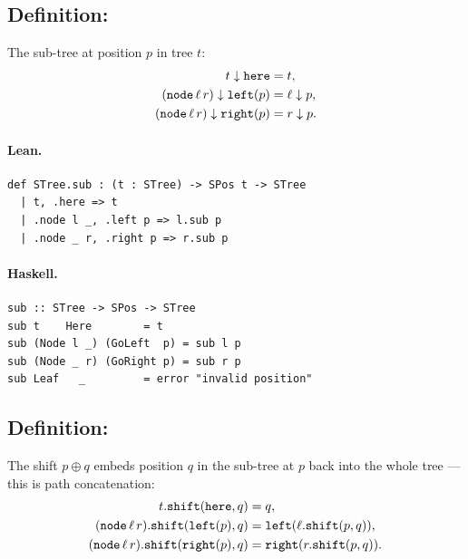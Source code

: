 \documentclass[11pt,a4paper]{article}
\begin{document}
\subsection{Definition: }

\begin{defn}
The sub-tree at position $p$ in tree $t$:
\begin{align*}
  t \downarrow \texttt{here} &= t, \\
  (\texttt{node}\,\ell\,r) \downarrow \texttt{left}(p) &= \ell \downarrow p, \\
  (\texttt{node}\,\ell\,r) \downarrow \texttt{right}(p) &= r \downarrow p.
\end{align*}
\end{defn}

\paragraph{Lean.}
\begin{lstlisting}[style=lean]
def STree.sub : (t : STree) -> SPos t -> STree
  | t, .here => t
  | .node l _, .left p => l.sub p
  | .node _ r, .right p => r.sub p
\end{lstlisting}

\paragraph{Haskell.}
\begin{lstlisting}[style=haskell]
sub :: STree -> SPos -> STree
sub t    Here        = t
sub (Node l _) (GoLeft  p) = sub l p
sub (Node _ r) (GoRight p) = sub r p
sub Leaf   _         = error "invalid position"
\end{lstlisting}


\subsection{Definition: }

\begin{defn}
The shift $p \oplus q$ embeds position $q$ in the sub-tree at $p$ back
into the whole tree --- this is path concatenation:
\begin{align*}
  t.\texttt{shift}(\texttt{here}, q) &= q, \\
  (\texttt{node}\,\ell\,r).\texttt{shift}(\texttt{left}(p), q)
    &= \texttt{left}(\ell.\texttt{shift}(p, q)), \\
  (\texttt{node}\,\ell\,r).\texttt{shift}(\texttt{right}(p), q)
    &= \texttt{right}(r.\texttt{shift}(p, q)).
\end{align*}
\end{defn}
\end{document}
